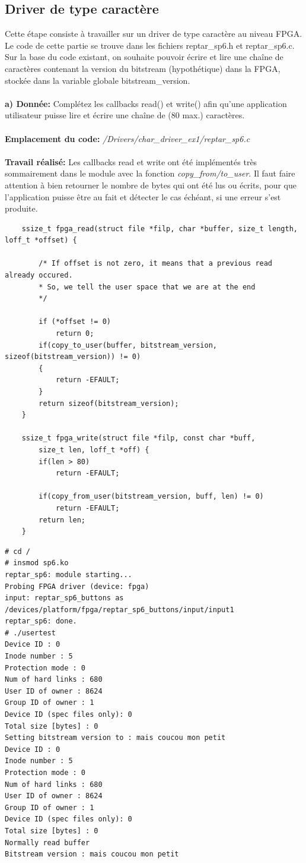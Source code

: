 \subsection{Driver de type caractère}
Cette étape consiste à travailler sur un driver de type caractère au niveau FPGA. Le code de cette
partie se trouve dans les fichiers reptar\_sp6.h et reptar\_sp6.c.
Sur la base du code existant, on souhaite pouvoir écrire et lire une chaîne de caractères contenant la
version du bitstream (hypothétique) dans la FPGA, stockée dans la variable globale bitstream\_version.\\\\
\textbf{a) Donnée: }Complétez les callbacks read() et write() afin qu'une application utilisateur puisse lire et écrire une
chaîne de (80 max.) caractères. \\\\
\textbf{Emplacement du code:}\textit{ /Drivers/char\_driver\_ex1/reptar\_sp6.c}\\\\
\textbf{Travail réalisé: }Les callbacks read et write ont été implémentés très sommairement dans le module avec la fonction 
\textit{copy\_from/to\_user}. Il faut faire attention à bien retourner le nombre de bytes qui ont été lus ou écrits, pour que l'application puisse être au fait et détecter le cas échéant, si une erreur s'est produite.\\

\begin{lstlisting}
	ssize_t fpga_read(struct file *filp, char *buffer, size_t length, loff_t *offset) {
		
		/* If offset is not zero, it means that a previous read already occured.
		* So, we tell the user space that we are at the end
		*/
		
		if (*offset != 0)
			return 0;
		if(copy_to_user(buffer, bitstream_version, sizeof(bitstream_version)) != 0)
		{
			return -EFAULT;
		}
		return sizeof(bitstream_version);			
	}
	
	ssize_t fpga_write(struct file *filp, const char *buff, 
		size_t len, loff_t *off) {
		if(len > 80)
			return -EFAULT;
		
		if(copy_from_user(bitstream_version, buff, len) != 0)
			return -EFAULT;
		return len;
	}
\end{lstlisting}

\begin{lstlisting}
# cd /
# insmod sp6.ko 
reptar_sp6: module starting...
Probing FPGA driver (device: fpga)
input: reptar_sp6_buttons as /devices/platform/fpga/reptar_sp6_buttons/input/input1
reptar_sp6: done.
# ./usertest 
Device ID : 0
Inode number : 5
Protection mode : 0
Num of hard links : 680
User ID of owner : 8624
Group ID of owner : 1
Device ID (spec files only): 0
Total size [bytes] : 0
Setting bitstream version to : mais coucou mon petit                                                          
Device ID : 0
Inode number : 5
Protection mode : 0
Num of hard links : 680
User ID of owner : 8624
Group ID of owner : 1
Device ID (spec files only): 0
Total size [bytes] : 0
Normally read buffer
Bitstream version : mais coucou mon petit
\end{lstlisting}

